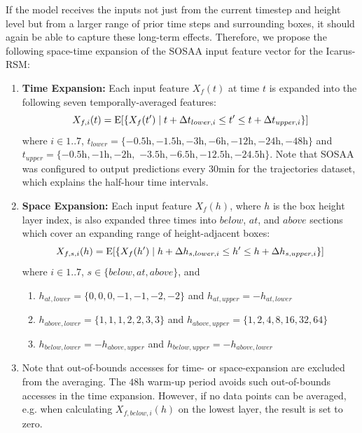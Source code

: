 \noindent If the model receives the inputs not just from the current timestep and height level but from a larger range of prior time steps and surrounding boxes, it should again be able to capture these long-term effects. Therefore, we propose the following space-time expansion of the SOSAA input feature vector for the Icarus-RSM:

\begin{enumerate}
    \item \textbf{Time Expansion:} Each input feature $X_f(t)$ at time $t$ is expanded into the following seven temporally-averaged features:
    \begin{equation*}
        X_{f,i}(t) = \text{E}[\{ X_{f}(t') \mathrel{|} t + \Delta t_{lower, i} \leq t' \leq t + \Delta t_{upper, i} \}]
    \end{equation*}
    where $i \in 1..7$, $t_{lower} = \{ -0.5\text{h}, -1.5\text{h}, -3\text{h}, -6\text{h}, -12\text{h}, -24\text{h}, -48\text{h} \}$ and $t_{upper} = \{ -0.5\text{h}, -1\text{h}, -2\text{h},$ $-3.5\text{h}, -6.5\text{h}, -12.5\text{h}, -24.5\text{h} \}$. Note that SOSAA was configured to output predictions every $30 \text{min}$ for the trajectories dataset, which explains the half-hour time intervals.

    \item \textbf{Space Expansion:} Each input feature $X_f(h)$, where $h$ is the box height layer index, is also expanded three times into $below$, $at$, and $above$ sections which cover an expanding range of height-adjacent boxes:
    \begin{equation*}
        X_{f,s,i}(h) = \text{E}[\{ X_{f}(h') \mathrel{|} h + \Delta h_{s, lower, i} \leq h' \leq h + \Delta h_{s, upper, i} \}]
    \end{equation*}
    where $i \in 1..7$, $s \in \{ below, at, above \}$, and
    \begin{enumerate}
        \item $h_{at, lower} = \{ 0, 0, 0, -1, -1, -2, -2 \}$ and $h_{at, upper} = -h_{at, lower}$
        \item $h_{above, lower} = \{ 1, 1, 1, 2, 2, 3, 3 \}$ and $h_{above, upper} = \{ 1, 2, 4, 8, 16, 32, 64 \}$
        \item $h_{below, lower} = -h_{above, upper}$ and $h_{below, upper} = -h_{above, lower}$
    \end{enumerate}

    \item Note that out-of-bounds accesses for time- or space-expansion are excluded from the averaging. The $48 \text{h}$ warm-up period avoids such out-of-bounds accesses in the time expansion. However, if no data points can be averaged, e.g. when calculating $X_{f, below, i}(h)$ on the lowest layer, the result is set to zero.


\end{enumerate}
